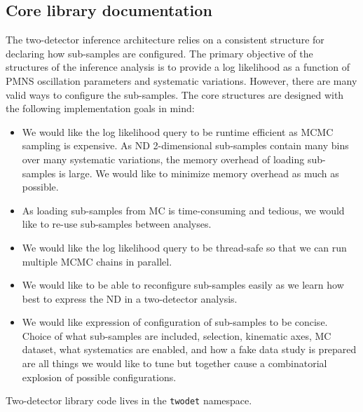 \documentclass{article}
\begin{document}
\subsection{Core library documentation}
The two-detector inference architecture relies on a consistent structure for declaring how sub-samples are configured. The primary objective of the structures of the inference analysis is to provide a log likelihood as a function of PMNS oscillation parameters and systematic variations. However, there are many valid ways to configure the sub-samples. The core structures are designed with the following implementation goals in mind:
\begin{itemize}
    \item We would like the log likelihood query to be runtime efficient as MCMC sampling is expensive. As ND 2-dimensional sub-samples contain many bins over many systematic variations, the memory overhead of loading sub-samples is large. We would like to minimize memory overhead as much as possible.
    \item As loading sub-samples from MC is time-consuming and tedious, we would like to re-use sub-samples between analyses.
    \item We would like the log likelihood query to be thread-safe so that we can run multiple MCMC chains in parallel.
    \item We would like to be able to reconfigure sub-samples easily as we learn how best to express the ND in a two-detector analysis.
    \item We would like expression of configuration of sub-samples to be concise. Choice of what sub-samples are included, selection, kinematic axes, MC dataset, what systematics are enabled, and how a fake data study is prepared are all things we would like to tune but together cause a combinatorial explosion of possible configurations.
\end{itemize}

Two-detector library code lives in the \texttt{twodet} namespace.
\end{document}
